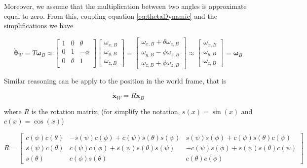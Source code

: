 \noindent Moreover, we assume that the multiplication between two angles is approximate equal to zero. From this, coupling equation \eqref{eq:thetaDynamic} and the simplifications we have

\begin{equation}
	\dot{\boldsymbol{\theta}}_W = T\boldsymbol{\omega}_B \approx 
	\begin{bmatrix}
		1 & 0      & \theta \\
		0 & 1      & -\phi  \\
		0 & \theta & 1 \\ 
	\end{bmatrix}
	\begin{bmatrix}
		\omega_{x,B} \\
		\omega_{y,B} \\
		\omega_{z,B}
	\end{bmatrix} = 
	\begin{bmatrix}
		\omega_{x,B}+\theta\omega_{z,B} \\
		\omega_{y,B}-\phi\omega_{z,B}   \\
		\omega_{z,B}+\phi\omega_{z,B}
	\end{bmatrix} \approx
	\begin{bmatrix}
		\omega_{x,B} \\
		\omega_{y,B} \\
		\omega_{z,B}
	\end{bmatrix}
	= \boldsymbol{\omega}_B
	\label{eq:MPCdyn4}
\end{equation}

\noindent Similar reasoning can be apply to the position in the world frame, that is

\begin{equation}
	\dot{\mathbf{x}}_W = R\dot{\mathbf{x}}_B
\end{equation}

\noindent where $R$ is the rotation matrix, (for simplify the notation, $s(x)=\sin(x)$ and $c(x)=\cos(x)$)

\begin{equation*}
	R = 
	\begin{bmatrix}
		c(\psi)c(\theta) & -s(\psi)c(\phi)+c(\psi)s(\theta)s(\psi) & s(\psi)s(\phi)+c(\psi)s(\theta)c(\psi) \\
		s(\psi)c(\theta) & c(\psi)c(\phi)+s(\psi)s(\theta)s(\psi) & -c(\psi)s(\phi)+s(\psi)s(\theta)c(\psi) \\
		s(\theta) & c(\phi)s(\theta) & c(\theta)c(\phi)
	\end{bmatrix}
\end{equation*} 

